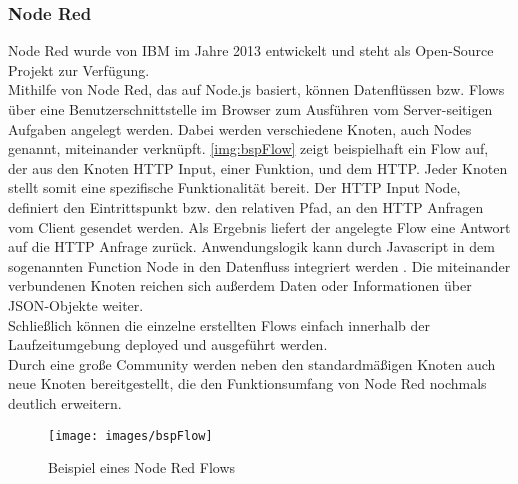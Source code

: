 \subsubsection{Node Red}
Node Red wurde von IBM im Jahre 2013 entwickelt und steht als Open-Source Projekt zur Verfügung\cite{nodeRed:nodeRedAbout}.\\
Mithilfe von Node Red, das auf Node.js basiert, können Datenflüssen bzw. Flows über eine Benutzerschnittstelle im Browser zum Ausführen vom Server-seitigen Aufgaben angelegt werden. Dabei werden verschiedene Knoten, auch Nodes genannt, miteinander verknüpft. \autoref{img:bspFlow} zeigt beispielhaft ein Flow auf, der aus den Knoten \acf{HTTP} Input, einer Funktion, und dem \ac{HTTP}. Jeder Knoten stellt somit eine spezifische Funktionalität bereit. Der \ac{HTTP} Input Node, definiert den Eintrittspunkt bzw. den relativen Pfad, an den \ac{HTTP} Anfragen vom Client gesendet werden. Als Ergebnis liefert der angelegte Flow eine Antwort auf die \ac{HTTP} Anfrage zurück. Anwendungslogik kann durch Javascript in dem sogenannten Function Node in den Datenfluss integriert werden . Die miteinander verbundenen Knoten reichen sich außerdem Daten oder Informationen über \ac{JSON}-Objekte weiter.
\\Schließlich können die einzelne erstellten Flows einfach innerhalb der Laufzeitumgebung deployed und ausgeführt werden. \\Durch eine große Community werden neben den standardmäßigen Knoten auch neue Knoten bereitgestellt, die den Funktionsumfang von Node Red nochmals deutlich erweitern\cite{nodeRed:nodeRed}.
\begin{figure}[H]
	\centering	
	\texttt{[image: images/bspFlow]}
	\caption{Beispiel eines Node Red Flows}
	\label{img:bspFlow}
\end{figure}




